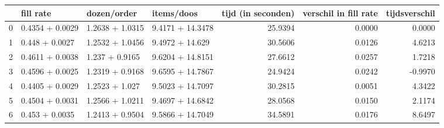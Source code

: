 \begin{tabular}{llllrrr}
\toprule
{} &        fill rate &      dozen/order &        items/doos &  tijd (in seconden) &  verschil in fill rate &  tijdsverschil \\
\midrule
0 &  0.4354 + 0.0029 &  1.2638 + 1.0315 &  9.4171 + 14.3478 &             25.9394 &                 0.0000 &         0.0000 \\
1 &   0.448 + 0.0027 &  1.2532 + 1.0456 &   9.4972 + 14.629 &             30.5606 &                 0.0126 &         4.6213 \\
2 &  0.4611 + 0.0038 &   1.237 + 0.9165 &  9.6204 + 14.8151 &             27.6612 &                 0.0257 &         1.7218 \\
3 &  0.4596 + 0.0025 &  1.2319 + 0.9168 &  9.6595 + 14.7867 &             24.9424 &                 0.0242 &        -0.9970 \\
4 &  0.4405 + 0.0029 &   1.2523 + 1.027 &  9.5023 + 14.7097 &             30.2815 &                 0.0051 &         4.3422 \\
5 &  0.4504 + 0.0031 &  1.2566 + 1.0211 &  9.4697 + 14.6842 &             28.0568 &                 0.0150 &         2.1174 \\
6 &   0.453 + 0.0035 &  1.2413 + 0.9504 &  9.5866 + 14.7049 &             34.5891 &                 0.0176 &         8.6497 \\
\bottomrule
\end{tabular}

